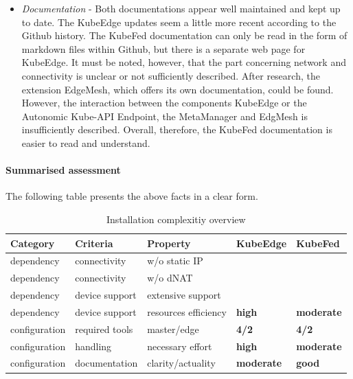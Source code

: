 \documentclass[MSC,Master,english]{twbook}%
\newcommand{\cmark}{\ding{51}}%
\newcommand{\xmark}{\ding{55}}%
\begin{document}
\begin{itemize}
    \item \textit{Documentation} - Both documentations appear well maintained and kept up to date. The KubeEdge updates seem a little more recent according to the Github history. The KubeFed documentation can only be read in the form of markdown files within Github, but there is a separate web page for KubeEdge. It must be noted, however, that the part concerning network and connectivity is unclear or not sufficiently described. After research, the extension EdgeMesh, which offers its own documentation, could be found. However, the interaction between the components KubeEdge or the Autonomic Kube-API Endpoint, the MetaManager and EdgMesh is insufficiently described. Overall, therefore, the KubeFed documentation is easier to read and understand.
\end{itemize}

\paragraph{Summarised assessment} The following table presents the above facts in a clear form. 
\begin{table}[ht]
    \begin{center}
        \begin{tabular}{|l|l|l|l|l|}
            \hline
            Category & Criteria & Property & \textbf{KubeEdge} & \textbf{KubeFed} \\
            \hline
            dependency & connectivity & w/o static \ac{IP} & \cmark & \xmark \\
            dependency & connectivity & w/o dNAT & \cmark & \xmark \\
            dependency & device support & extensive support & \cmark & \cmark \\
            dependency & device support & resources efficiency & \textbf{high} & \textbf{moderate} 
            \\
            configuration & required tools & master/edge & \textbf{4/2} & \textbf{4/2} \\
            configuration & handling & necessary effort & \textbf{high} & \textbf{moderate} \\
            configuration & documentation & clarity/actuality & \textbf{moderate} & \textbf{good} \\
            \hline
        \end{tabular}
        \caption{Installation complexitiy overview}
        \label{tab:install-overview}
    \end{center}
\end{table}
\end{document}
